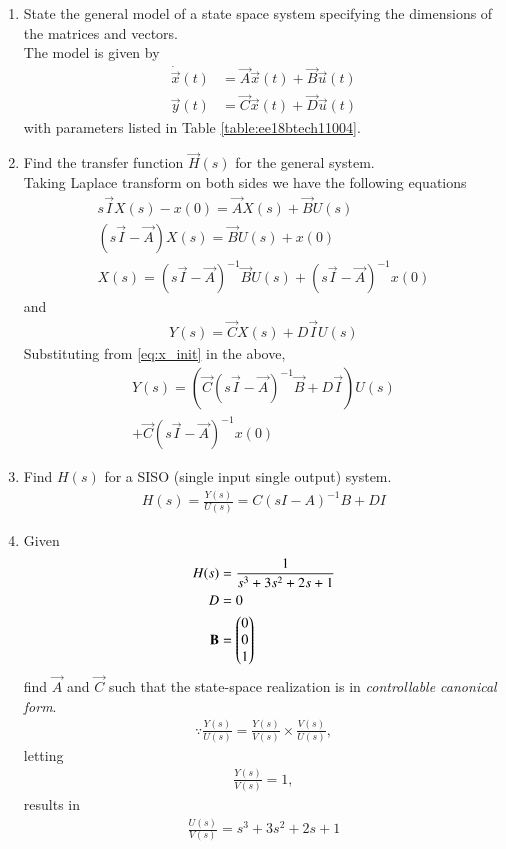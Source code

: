 \begin{enumerate}[label=\thesubsection.\arabic*.,ref=\thesubsection.\theenumi]
\item State the general model of a state space system specifying the dimensions of the matrices and vectors.
\\
\solution The model is given by 
\begin{align}
\dot{\vec{x}}(t)&=\vec{A}\vec{x}(t)+\vec{B}\vec{u}(t) \\
 \vec{y}(t)&=\vec{C}\vec{x}(t)+\vec{D} \vec{u}(t)
\end{align}
%
with parameters listed in Table \ref{table:ee18btech11004}.
%
\begin{table}[!ht]
\centering

\caption{}
\label{table:ee18btech11004}
\end{table}
\item Find the transfer function $\vec{H}(s)$ for the general system.
\\
\solution 
Taking Laplace transform on both sides we have the following equations
\begin{align}
s\vec{I}X(s)-x(0)= \vec{A}X(s)+ \vec{B}U(s)\\
(s\vec{I}-\vec{A})X(s)= \vec{B}U(s)+ x(0)\\
X(s)={(s\vec{I}-\vec{A})^{-1}}\vec{B} U(s)+ (s\vec{I}-\vec{A})^{-1}x(0)
\label{eq:x_init}
\end{align}
and
\begin{align}
Y(s)= \vec{C}X(s)+D\vec{I}U(s)
\end{align}
Substituting from \eqref{eq:x_init} in the above,
%
\begin{multline}
Y(s)=( \vec{C}{(s\vec{I}-\vec{A})^{-1}}\vec{B}+D\vec{I}) U(s) 
\\
+ \vec{C}(s\vec{I}-\vec{A})^{-1}x(0)
\end{multline}
%
\item Find $H(s)$ for a SISO (single input single output) system.
\\
\solution
\begin{align}
H(s)= {\frac{Y(s)}{U(s)}}= C{(sI-A)^{-1}}B+DI
\end{align}

\item Given 
\begin{align}
H(s)&=\frac{1}{s^3+3s^2+2s+1}
\\
D&=0
\\
\mathbf{B}&= \begin{pmatrix}0\\0\\1\end{pmatrix}
\end{align}
%
 find $\vec{A}$ and $\vec{C}$ such that the state-space realization is in {\em controllable canonical form}.
\\
\solution 
\begin{align} 
\because {\frac{Y(s)}{U(s)}}= \frac{Y(s)}{V(s)} \times \frac{V(s)}{U(s)},
\end{align}
letting
\begin{align}
 {\frac{Y(s)}{V(s)}}= 1, 
\end{align}
results in 
\begin{align}
{\frac{U(s)}{V(s)}}={s^3 + 3s^2+2s + 1}
\end{align}


\end{enumerate}

